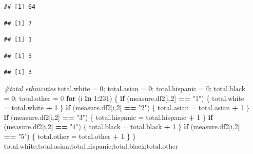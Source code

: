 \documentclass[]{article}
\newenvironment{Shaded}{\begin{snugshade}}{\end{snugshade}}
\newcommand{\CommentTok}[1]{\textcolor[rgb]{0.56,0.35,0.01}{\textit{#1}}}
\newcommand{\ControlFlowTok}[1]{\textcolor[rgb]{0.13,0.29,0.53}{\textbf{#1}}}
\newcommand{\DecValTok}[1]{\textcolor[rgb]{0.00,0.00,0.81}{#1}}
\newcommand{\NormalTok}[1]{#1}
\newcommand{\OperatorTok}[1]{\textcolor[rgb]{0.81,0.36,0.00}{\textbf{#1}}}
\newcommand{\StringTok}[1]{\textcolor[rgb]{0.31,0.60,0.02}{#1}}
\begin{document}
\begin{verbatim}
## [1] 64
\end{verbatim}

\begin{verbatim}
## [1] 7
\end{verbatim}

\begin{verbatim}
## [1] 1
\end{verbatim}

\begin{verbatim}
## [1] 5
\end{verbatim}

\begin{verbatim}
## [1] 3
\end{verbatim}

\begin{Shaded}
\begin{Highlighting}[]
\CommentTok{#total ethnicities}
\NormalTok{total.white =}\StringTok{ }\DecValTok{0}\NormalTok{; total.asian =}\StringTok{ }\DecValTok{0}\NormalTok{; total.hispanic =}\StringTok{ }\DecValTok{0}\NormalTok{; total.black =}\StringTok{ }\DecValTok{0}\NormalTok{; total.other =}\StringTok{ }\DecValTok{0}
\ControlFlowTok{for}\NormalTok{ (i }\ControlFlowTok{in} \DecValTok{1}\OperatorTok{:}\DecValTok{231}\NormalTok{)}
\NormalTok{\{}
  \ControlFlowTok{if}\NormalTok{ (measure.df2[i,}\DecValTok{2}\NormalTok{] }\OperatorTok{==}\StringTok{ "1"}\NormalTok{)}
\NormalTok{  \{}
\NormalTok{    total.white =}\StringTok{ }\NormalTok{total.white }\OperatorTok{+}\StringTok{ }\DecValTok{1}
\NormalTok{  \}}
  \ControlFlowTok{if}\NormalTok{ (measure.df2[i,}\DecValTok{2}\NormalTok{] }\OperatorTok{==}\StringTok{ "2"}\NormalTok{)}
\NormalTok{  \{}
\NormalTok{    total.asian =}\StringTok{ }\NormalTok{total.asian }\OperatorTok{+}\StringTok{ }\DecValTok{1}
\NormalTok{  \}}
  \ControlFlowTok{if}\NormalTok{ (measure.df2[i,}\DecValTok{2}\NormalTok{] }\OperatorTok{==}\StringTok{ "3"}\NormalTok{)}
\NormalTok{  \{}
\NormalTok{    total.hispanic =}\StringTok{ }\NormalTok{total.hispanic }\OperatorTok{+}\StringTok{ }\DecValTok{1}
\NormalTok{  \}}
  \ControlFlowTok{if}\NormalTok{ (measure.df2[i,}\DecValTok{2}\NormalTok{] }\OperatorTok{==}\StringTok{ "4"}\NormalTok{)}
\NormalTok{  \{}
\NormalTok{    total.black =}\StringTok{ }\NormalTok{total.black }\OperatorTok{+}\StringTok{ }\DecValTok{1}
\NormalTok{  \}}
  \ControlFlowTok{if}\NormalTok{ (measure.df2[i,}\DecValTok{2}\NormalTok{] }\OperatorTok{==}\StringTok{ "5"}\NormalTok{)}
\NormalTok{  \{}
\NormalTok{    total.other =}\StringTok{ }\NormalTok{total.other }\OperatorTok{+}\StringTok{ }\DecValTok{1}
\NormalTok{  \}}
\NormalTok{\}}
\NormalTok{total.white;total.asian;total.hispanic;total.black;total.other}
\end{Highlighting}
\end{Shaded}
\end{document}

